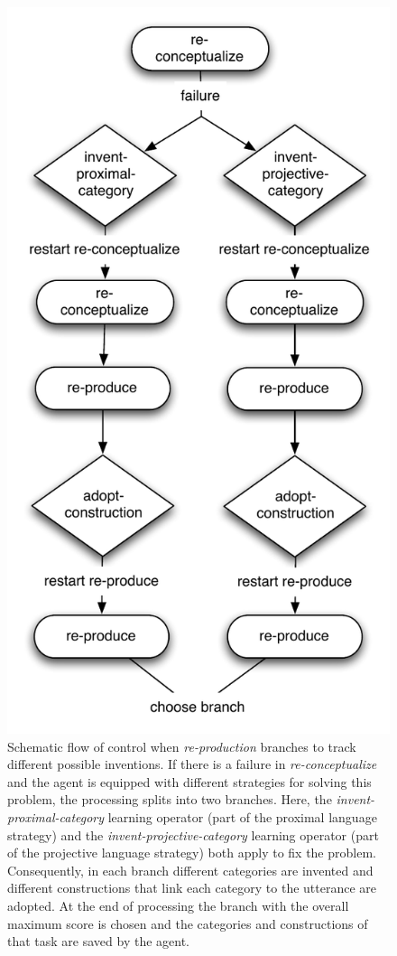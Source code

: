 \begin{figure} 
\begin{center}
\includegraphics[width=0.5\columnwidth]{figs/re-production-branching}
\end{center}
\caption[Schematic flow of control when \emph{re-production} branches]{
Schematic flow of control when \emph{re-production} branches to track
different possible inventions. If there is a failure in \emph{re-conceptualize} and
the agent is equipped with different strategies for solving this problem, the processing
splits into two branches. Here, the \emph{invent-proximal-category} learning operator
(part of the proximal language strategy) and the 
\emph{invent-projective-category} learning operator 
(part of the projective language strategy) both apply to 
fix the problem. Consequently, in each branch different
categories are invented and different constructions that 
link each category to the utterance are adopted.
At the end of processing the branch with the overall 
maximum score is chosen and the categories
and constructions of that task are saved by the agent.}
\label{f:re-production-branching}
\end{figure}


